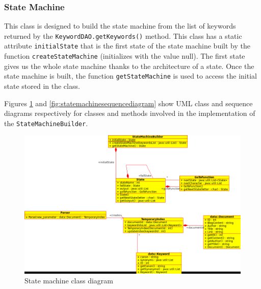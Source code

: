 \documentclass[10pt]{report}
\begin{document}
\subsubsection{State Machine}
This class is designed to build the state machine from the list of
keywords returned by the \texttt{KeywordDAO.getKeywords()} method. This class has a static
attribute \texttt{initialState} that is the first state of the state machine
built by the function \texttt{createStateMachine} (initializes with the value
null). The first state gives us the whole state machine thanks to the
architecture of a state. Once the state machine is built, the function
\texttt{getStateMachine} is used to access the initial state stored in the
class.

Figures \ref{fig:statemachineclassdiagram} and
\ref{fig:statemachinesequencediagram} show UML class and sequence
diagrams respectively for classes and methods involved in the
implementation of the \texttt{StateMachineBuilder}.

\begin{figure}
  \begin{center}
        \includegraphics[width=\textwidth,height=!]{statemachineclassdiagram}
  \end{center}
  \caption{State machine class diagram}
  \label{fig:statemachineclassdiagram}
\end{figure} 
\end{document}
